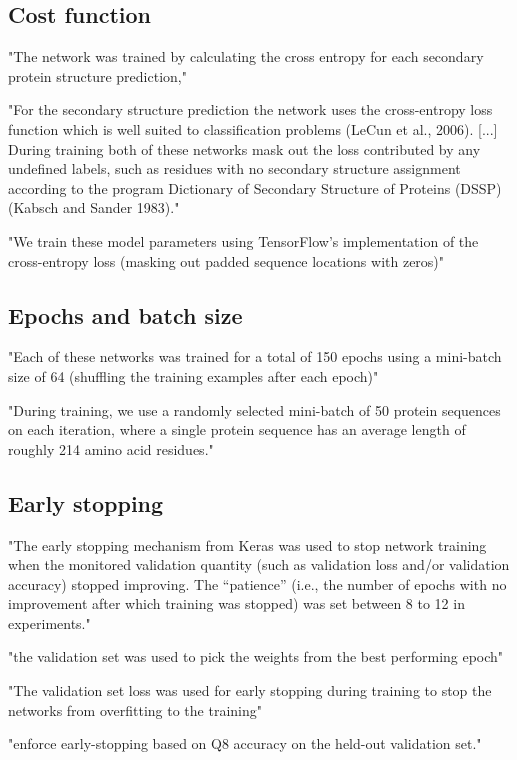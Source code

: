 \documentclass[]{scrartcl}
\begin{document}
\subsection{Cost function}
"The network was trained by calculating the cross entropy for each secondary protein structure prediction," \cite{Jurtz2017}

"For the secondary structure prediction the network uses the cross-entropy loss function which is well suited to classification problems (LeCun et al., 2006). [...] During training both of these networks mask out the loss contributed by any undefined labels, such as residues with no secondary structure assignment according to the program Dictionary of Secondary Structure of Proteins (DSSP) (Kabsch and Sander 1983)." \cite{Heffernan2017}

"We train these model parameters using TensorFlow’s implementation of the cross-entropy loss (masking out padded sequence locations with zeros)" \cite{Busia2017}
\subsection{Epochs and batch size}
"Each of these networks was trained for a total of 150 epochs using a mini-batch size of 64 (shuffling the training examples after each epoch)" \cite{Jurtz2017}

"During training, we use a randomly selected mini-batch of 50 protein sequences on each iteration, where a single protein sequence has an average length of roughly 214 amino acid residues." \cite{Busia2017}

\subsection{Early stopping}
"The early stopping mechanism from Keras was used to stop network training when the monitored validation quantity (such as validation loss and/or validation accuracy) stopped improving. The “patience” (i.e., the number of epochs with no improvement after which training was stopped) was set between 8 to 12 in experiments." \cite{Fang2017}

"the validation set was used to pick the weights from the best performing epoch" \cite{Jurtz2017}

"The validation set loss was used for early stopping during training to stop the networks from overfitting to the training" \cite{Heffernan2017}

"enforce early-stopping based on Q8 accuracy on the held-out validation set." \cite{Busia2017}
\end{document}
